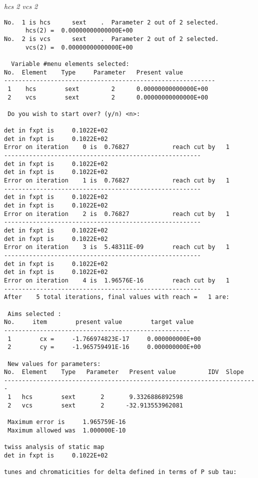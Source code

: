 {\em hcs 2 vcs 2}
\begin{footnotesize}
\begin{verbatim}
No.  1 is hcs      sext    .  Parameter 2 out of 2 selected.
      hcs(2) =  0.00000000000000E+00
No.  2 is vcs      sext    .  Parameter 2 out of 2 selected.
      vcs(2) =  0.00000000000000E+00

  Variable #menu elements selected:
No.  Element    Type     Parameter   Present value
-----------------------------------------------------------
 1    hcs        sext         2      0.00000000000000E+00
 2    vcs        sext         2      0.00000000000000E+00

 Do you wish to start over? (y/n) <n>:

det in fxpt is     0.1022E+02
det in fxpt is     0.1022E+02
Error on iteration    0 is  0.76827            reach cut by   1
-------------------------------------------------------
det in fxpt is     0.1022E+02
det in fxpt is     0.1022E+02
Error on iteration    1 is  0.76827            reach cut by   1
-------------------------------------------------------
det in fxpt is     0.1022E+02
det in fxpt is     0.1022E+02
Error on iteration    2 is  0.76827            reach cut by   1
-------------------------------------------------------
det in fxpt is     0.1022E+02
det in fxpt is     0.1022E+02
Error on iteration    3 is  5.48311E-09        reach cut by   1
-------------------------------------------------------
det in fxpt is     0.1022E+02
det in fxpt is     0.1022E+02
Error on iteration    4 is  1.96576E-16        reach cut by   1
-------------------------------------------------------
After    5 total iterations, final values with reach =   1 are:

 Aims selected :
No.     item        present value        target value
----------------------------------------------------
 1        cx =     -1.766974823E-17     0.000000000E+00
 2        cy =     -1.965759491E-16     0.000000000E+00

 New values for parameters:
No.  Element    Type   Parameter   Present value         IDV  Slope
-----------------------------------------------------------------------
 1   hcs        sext       2       9.3326886892598
 2   vcs        sext       2      -32.913553962081

 Maximum error is     1.965759E-16
 Maximum allowed was  1.000000E-10

twiss analysis of static map
det in fxpt is     0.1022E+02

tunes and chromaticities for delta defined in terms of P sub tau:


\end{verbatim}
\end{footnotesize}
